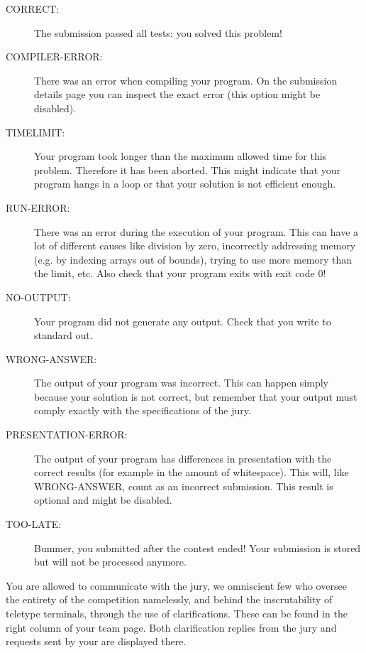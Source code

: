 \documentclass[a4paper]{article}
\begin{document}
\begin{description}
    \item[CORRECT:]
        The submission passed all tests: you solved this problem!

    \item[COMPILER-ERROR:]
        There was an error when compiling your program. On the submission
        details page you can inspect the exact error (this option might be
        disabled).

    \item[TIMELIMIT:]
        Your program took longer than the maximum allowed time for this
        problem. Therefore it has been aborted. This might indicate that your
        program hangs in a loop or that your solution is not efficient
        enough.

    \item[RUN-ERROR:]
        There was an error during the execution of your program. This can have
        a lot of different causes like division by zero, incorrectly
        addressing memory (e.g. by indexing arrays out of bounds), trying to
        use more memory than the limit, etc.
        Also check that your program exits with exit code 0!

    \item[NO-OUTPUT:]
        Your program did not generate any output. Check that you write to
        standard out.

    \item[WRONG-ANSWER:]
        The output of your program was incorrect. This can happen simply
        because your solution is not correct, but remember that your output
        must comply exactly with the specifications of the jury.

    \item[PRESENTATION-ERROR:]
        The output of your program has differences in presentation with the
        correct results (for example in the amount of whitespace). This will,
        like WRONG-ANSWER, count as an incorrect submission. This result is
        optional and might be disabled.

    \item[TOO-LATE:]
        Bummer, you submitted after the contest ended! Your submission is
        stored but will not be processed anymore.
\end{description}

You are allowed to communicate with the jury, we omniscient few who oversee the entirety of the competition namelessly, and behind the inscrutability of teletype terminals, through the use of clarifications. These can be found in the right column of your team page. Both clarification replies from the jury and requests sent by your are displayed there. 
\end{document}
